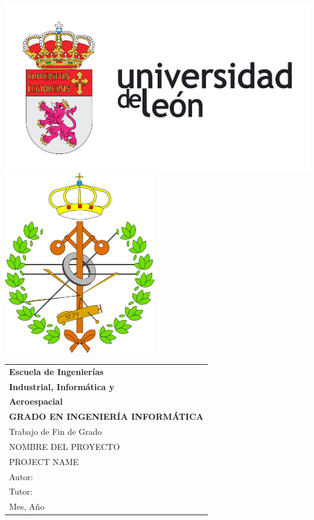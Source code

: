 \thispagestyle{empty}
\graphicspath{{./res/images/}}

\begin{table}[ht]
	\centering

	\hfill
	\\[-10ex]
	\includegraphics{imageULE}
	\hfill
	\includegraphics{imageInformatica}
	\\[10ex]

	\label{tab:coverTopCenter}
	\begin{tabular}{p{1\linewidth}}
		\centering
		\LARGE\textbf{Escuela de Ingenierías}
		\\[1.5ex]

		\LARGE\textbf{Industrial, Informática y} \\
		\LARGE\textbf{Aeroespacial}
		\\[2.3ex]

		\LARGE\textbf{GRADO EN INGENIERÍA INFORMÁTICA}
		\\[5ex]

		\LARGE{Trabajo de Fin de Grado}
		\\[5ex]

		\LARGE{\uppercase{Nombre del proyecto}}
		\\[5ex]

		\LARGE{\uppercase{Project name}}
		\\[8ex]

		\hfill\large{Autor:}
		\\[3pt]
		\hfill\large{Tutor:}
		\\[5ex]

		\huge{Mes, Año}
	\end{tabular}
\end{table}

